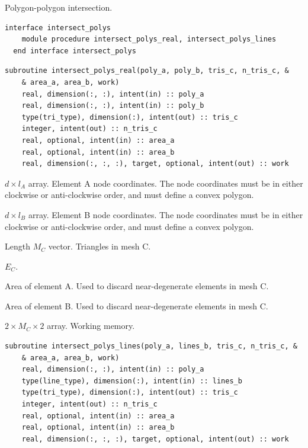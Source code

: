 \documentclass{article}
\begin{document}
\noindent Polygon-polygon intersection.
  
\begin{lstlisting}[language=FORTRAN]
  interface intersect_polys
    module procedure intersect_polys_real, intersect_polys_lines
  end interface intersect_polys
\end{lstlisting}
  
\begin{lstlisting}[language=FORTRAN]
  subroutine intersect_polys_real(poly_a, poly_b, tris_c, n_tris_c, &
    & area_a, area_b, work)
    real, dimension(:, :), intent(in) :: poly_a
    real, dimension(:, :), intent(in) :: poly_b
    type(tri_type), dimension(:), intent(out) :: tris_c
    integer, intent(out) :: n_tris_c
    real, optional, intent(in) :: area_a
    real, optional, intent(in) :: area_b
    real, dimension(:, :, :), target, optional, intent(out) :: work
\end{lstlisting}

\begin{description}[font=\ttfamily\bfseries,leftmargin=2.2\parindent,labelindent=1.7\parindent,noitemsep]
  \item[poly\_a] $d \times l_A$ array. Element A node coordinates. The node
    coordinates must be in either clockwise or anti-clockwise order, and must
    define a convex polygon.
  \item[poly\_b] $d \times l_B$ array. Element B node coordinates. The node
    coordinates must be in either clockwise or anti-clockwise order, and must
    define a convex polygon.
  \item[tris\_c] Length $M_C$ vector. Triangles in mesh C.
  \item[n\_tris\_c] $E_C$.
  \item[area\_a] Area of element A. Used to discard near-degenerate elements in
    mesh C.
  \item[area\_b] Area of element B. Used to discard near-degenerate elements in
    mesh C.
  \item[work] $2 \times M_C \times 2$ array. Working memory.
\end{description}

\begin{lstlisting}[language=FORTRAN]
  subroutine intersect_polys_lines(poly_a, lines_b, tris_c, n_tris_c, &
    & area_a, area_b, work)
    real, dimension(:, :), intent(in) :: poly_a
    type(line_type), dimension(:), intent(in) :: lines_b
    type(tri_type), dimension(:), intent(out) :: tris_c
    integer, intent(out) :: n_tris_c
    real, optional, intent(in) :: area_a
    real, optional, intent(in) :: area_b
    real, dimension(:, :, :), target, optional, intent(out) :: work
\end{lstlisting}
\end{document}
